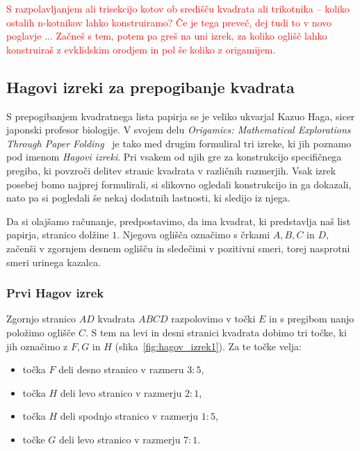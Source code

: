 \textcolor{red}{S razpolavljanjem ali trisekcijo kotov ob središču kvadrata ali trikotnika -- koliko ostalih n-kotnikov lahko konstruiramo? Če je tega preveč, dej tudi to v novo poglavje ... Začneš s tem, potem pa greš na uni izrek, za koliko oglišč lahko konstruiraš z evklidskim orodjem in pol še koliko z origamijem.}

\subsection{Hagovi izreki za prepogibanje kvadrata}

S prepogibanjem kvadratnega lista papirja se je veliko ukvarjal Kazuo Haga, sicer japonski profesor biologije. V svojem delu \emph{Origamics: Mathematical Explorations Through Paper Folding}~\cite{haga2008} je tako med drugim formuliral tri izreke, ki jih poznamo pod imenom \emph{Hagovi izreki}. Pri vsakem od njih gre za konstrukcijo specifičnega pregiba, ki povzroči delitev stranic kvadrata v različnih razmerjih. Vsak izrek posebej bomo najprej formulirali, si slikovno ogledali konstrukcijo in ga dokazali, nato pa si pogledali še nekaj dodatnih lastnosti, ki sledijo iz njega.

Da si olajšamo računanje, predpostavimo, da ima kvadrat, ki predstavlja naš list papirja, stranico dolžine $1$. Njegova oglišča označimo s črkami $A, B, C$ in $D$, začenši v zgornjem desnem oglišču in sledečimi v pozitivni smeri, torej nasprotni smeri urinega kazalca.

\subsubsection{Prvi Hagov izrek}

\begin{izrek}
    Zgornjo stranico $AD$ kvadrata $ABCD$ razpolovimo v točki $E$ in s pregibom nanjo položimo oglišče $C$. S tem na levi in desni stranici kvadrata dobimo tri točke, ki jih označimo z $F, G$ in $H$ (slika~\ref{fig:hagov_izrek1}). Za te točke velja:
    \begin{itemize}
        \item točka $F$ deli desno stranico v razmeru $3:5$,
        \item točka $H$ deli levo stranico v razmerju $2:1$,
        \item točka $H$ deli spodnjo stranico v razmerju $1:5$,
        \item točke $G$ deli levo stranico v razmerju $7:1$.
    \end{itemize}
\end{izrek}

